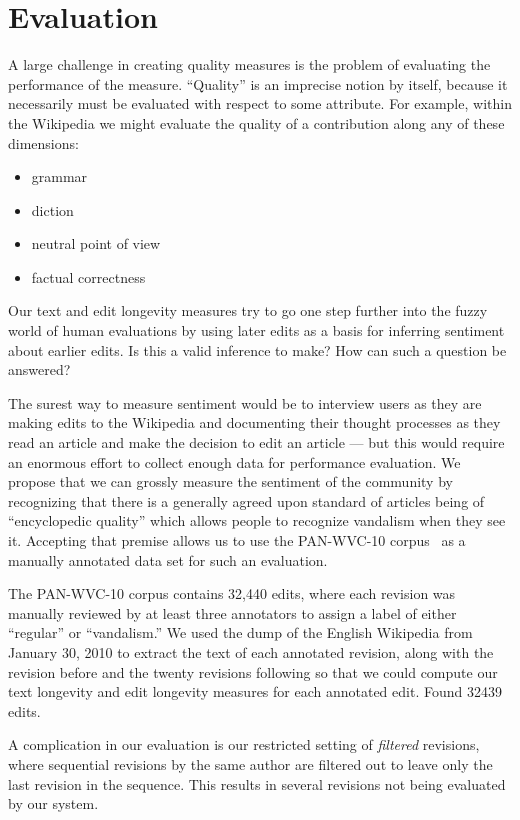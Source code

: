 \section{Evaluation}


A large challenge in creating quality measures is the
problem of evaluating the performance of the measure.
``Quality'' is an imprecise notion by itself, because it
necessarily must be evaluated with respect to some attribute.
For example, within the Wikipedia we might evaluate the quality
of a contribution along any of these dimensions:
\begin{itemize}
\item grammar
\item diction
\item neutral point of view
\item factual correctness
\end{itemize}
Our text and edit longevity measures try to go one step
further into the fuzzy world of human evaluations by using
later edits as a basis for inferring sentiment about earlier edits.
Is this a valid inference to make?
How can such a question be answered?

The surest way to measure sentiment would be to interview
users as they are making edits to the Wikipedia and documenting
their thought processes as they read an article and make the
decision to edit an article --- but this would require an enormous
effort to collect enough data for performance evaluation.
We propose that we can grossly measure the sentiment of the
community by recognizing that there is a generally agreed upon
standard of articles being of ``encyclopedic quality''
which allows people to recognize vandalism when they see it.
Accepting that premise allows us to use the PAN-WVC-10
corpus~\cite{Potthast2010a} as a manually annotated data set for
such an evaluation.

The PAN-WVC-10 corpus contains 32,440 edits, where each revision was
manually reviewed by at least three annotators to assign a label
of either ``regular'' or ``vandalism.''
We used the dump of the English Wikipedia from January 30, 2010
to extract the text of each annotated revision, along with the revision
before and the twenty revisions following so that we could compute
our text longevity and edit longevity measures for each annotated edit.
Found 32439 edits.

A complication in our evaluation is our restricted setting of
\textit{filtered} revisions, where sequential revisions by the
same author are filtered out to leave only the last revision
in the sequence.
This results in several revisions not being evaluated by our system.


